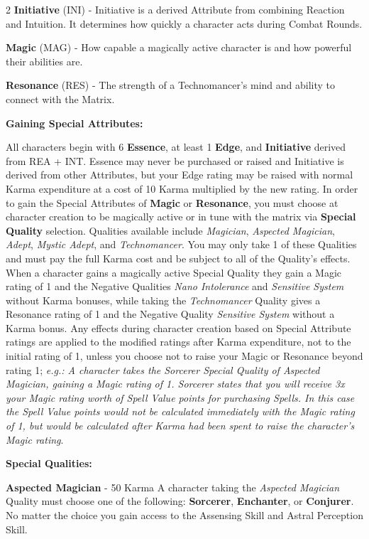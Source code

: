 \documentclass[
  oneside]{article}
\begin{document}
\begin{multicols}{2}
\textbf{Initiative} (INI) - Initiative is a
derived Attribute from combining Reaction and
Intuition. It determines how quickly a character
acts during Combat Rounds.

\textbf{Magic} (MAG) - How capable a magically
active character is and how powerful their
abilities are.

\textbf{Resonance} (RES) - The strength of a
Technomancer's mind and ability to connect with
the Matrix.

\textbf{Gaining Special Attributes:}

All characters begin with 6 \textbf{Essence}, at
least 1 \textbf{Edge}, and \textbf{Initiative}
derived from REA + INT. Essence may never be
purchased or raised and Initiative is derived from
other Attributes, but your Edge rating may be
raised with normal Karma expenditure at a cost of
10 Karma multiplied by the new rating. In order to
gain the Special Attributes of \textbf{Magic} or
\textbf{Resonance}, you must choose at character
creation to be magically active or in tune with
the matrix via \textbf{Special Quality} selection.
Qualities available include \emph{Magician},
\emph{Aspected Magician}, \emph{Adept},
\emph{Mystic Adept}, and \emph{Technomancer}. You
may only take 1 of these Qualities and must pay
the full Karma cost and be subject to all of the
Quality's effects. When a character gains a
magically active Special Quality they gain a Magic
rating of 1 and the Negative Qualities \emph{Nano
Intolerance} and \emph{Sensitive System} without
Karma bonuses, while taking the
\emph{Technomancer} Quality gives a Resonance
rating of 1 and the Negative Quality
\emph{Sensitive System} without a Karma bonus. Any
effects during character creation based on Special
Attribute ratings are applied to the modified
ratings after Karma expenditure, not to the
initial rating of 1, unless you choose not to
raise your Magic or Resonance beyond rating 1;
\emph{e.g.: A character takes the Sorcerer Special
Quality of Aspected Magician, gaining a Magic
rating of 1. Sorcerer states that you will receive
3x your Magic rating worth of Spell Value points
for purchasing Spells. In this case the Spell
Value points would not be calculated immediately
with the Magic rating of 1, but would be
calculated after Karma had been spent to raise the
character's Magic rating}.

\textbf{Special Qualities:}

\textbf{Aspected Magician} - 50 Karma A character
taking the \emph{Aspected Magician} Quality must
choose one of the following: \textbf{Sorcerer},
\textbf{Enchanter}, or \textbf{Conjurer}. No
matter the choice you gain access to the Assensing
Skill and Astral Perception Skill.


\end{multicols}
\end{document}
